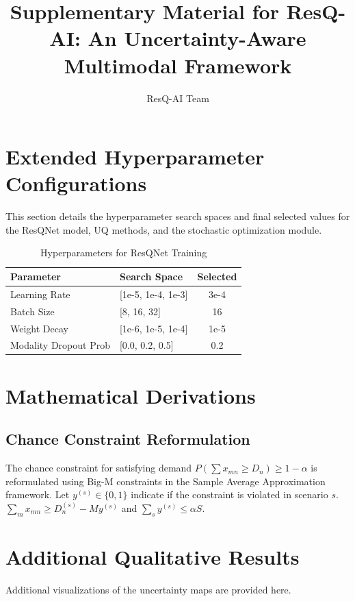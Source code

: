 \documentclass[journal]{IEEEtran}
\begin{document}
\title{Supplementary Material for ResQ-AI: An Uncertainty-Aware Multimodal Framework}

\author{ResQ-AI Team}

\maketitle

\section{Extended Hyperparameter Configurations}
\label{sec:hyperparams}
This section details the hyperparameter search spaces and final selected values for the ResQNet model, UQ methods, and the stochastic optimization module.

\begin{table}[H]
\centering
\caption{Hyperparameters for ResQNet Training}
\begin{tabular}{llc}
\toprule
Parameter & Search Space & Selected \\
\midrule
Learning Rate & [1e-5, 1e-4, 1e-3] & 3e-4 \\
Batch Size & [8, 16, 32] & 16 \\
Weight Decay & [1e-6, 1e-5, 1e-4] & 1e-5 \\
Modality Dropout Prob & [0.0, 0.2, 0.5] & 0.2 \\
\bottomrule
\end{tabular}
\end{table}

\section{Mathematical Derivations}
\label{sec:math}
\subsection{Chance Constraint Reformulation}
The chance constraint for satisfying demand $P(\sum x_{mn} \ge D_n) \ge 1 - \alpha$ is reformulated using Big-M constraints in the Sample Average Approximation framework.
Let $y^{(s)} \in \{0,1\}$ indicate if the constraint is violated in scenario $s$.
$\sum_{m} x_{mn} \ge D_n^{(s)} - M y^{(s)}$ and $\sum_s y^{(s)} \le \alpha S$.

\section{Additional Qualitative Results}
\label{sec:qualitative}
Additional visualizations of the uncertainty maps are provided here.
\end{document}
